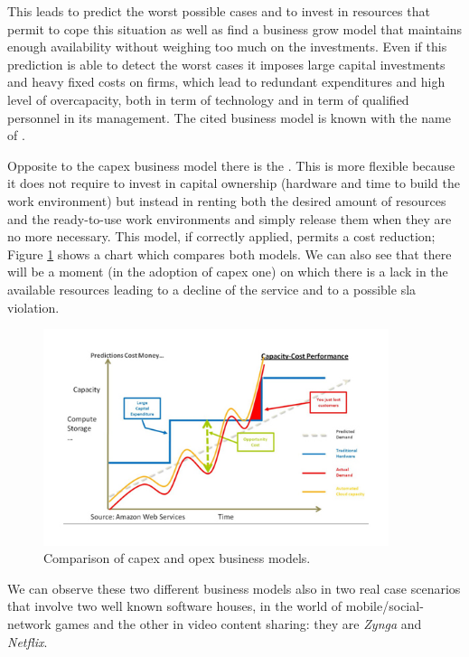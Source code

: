 This leads to predict the worst possible cases and to invest in resources that permit to cope this
situation as well as find a business grow model that maintains enough availability without weighing
too much on the investments. Even if this prediction is able to detect the worst cases it imposes
large capital investments and heavy fixed costs on firms, which lead to redundant expenditures and
high level of overcapacity, both in term of technology and in term of qualified personnel in its
management. The cited business model is known with the name of .

Opposite to the \ac{capex} business model there is the . This is more flexible
because it does not require to invest in capital ownership (hardware and time to build the work
environment) but instead in renting both the desired amount of resources and the ready-to-use work
environments and simply release them when they are no more necessary. This model, if correctly applied,
permits a cost reduction; Figure \ref{img:background-capexOpex-model} shows a chart which compares
both models. We can also see that there will be a moment (in the adoption of \ac{capex} one) on which
there is a lack in the available resources leading to a decline of the service and to a possible \ac{sla}
violation.

\begin{figure}
	\centering{}
	\includegraphics[width=0.9\textwidth]{chapters/background/images/capex-opex.png}
	\caption[Comparison between \acs{capex} and \acs{opex} business models]{Comparison of \acf{capex}
		and \acf{opex} business models.}
	\label{img:background-capexOpex-model}
\end{figure}

We can observe these two different business models also in two real case scenarios \cite{netflixZynga}
that involve two well known software houses, in the world of mobile/social-network games and the other
in video content sharing: they are \textit{Zynga} and \textit{Netflix}. 

